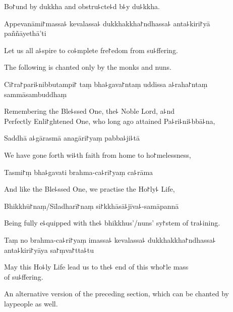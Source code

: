 \begin{english}
  Bo꜓und by dukkha and obstru꜕cte꜕d b꜕y du꜕kkha.
\end{english}

Appevanāmi꜓massa꜕ kevalassa꜕ dukkhakkha꜓ndhassa꜕ anta꜕kiri꜓yā \\paññāyethā'ti

\begin{english}
  Let us all a꜕spire to co꜕mplete fre꜓edom from su꜕ffering.
\end{english}

\begin{instruction}
  The following is chanted only by the monks and nuns.
\end{instruction}

%
Ci꜓ra꜓pari꜕nibbutampi꜓ taṃ bha꜕gava꜓ntaṃ uddissa a꜕raha꜓ntaṃ sammāsambuddhaṃ

\begin{english}
  Remembering the Ble꜕ssed One, the꜕ Noble Lord, a꜕nd \\Perfectly Enli꜓ghtened One, who long ago attained Pa꜕ri꜕ni꜕bbā꜕na,
\end{english}

Saddhā a꜕gārasmā anagāri꜓yaṃ pabba꜕ji꜕tā

\begin{english}
  We have gone forth wi꜕th faith from home to ho꜓melessness,
\end{english}

Tasmi꜓ṃ bha꜕gavati brahma-ca꜕ri꜓yaṃ ca꜕rāma

\begin{english}
  And like the Ble꜕ssed One, we practise the Ho꜓ly꜕ Life,
\end{english}

Bhikkhū꜓naṃ/Sīladharī꜓naṃ si꜓kkhāsā꜕jīva꜕-samāpannā

\begin{english}
  Being fully e꜕quipped with the꜕ bhikkhus'/nuns' sy꜓stem of tra꜕ining.
\end{english}

Taṃ no brahma-ca꜕ri꜓yaṃ imassa꜕ kevalassa꜕ dukkhakkha꜓ndhassa꜕ anta꜕kiri꜓yāya sa꜓ṃva꜓tta꜕tu

\begin{english}
  May this Ho꜕ly Life lead us to the꜕ end of this who꜓le mass \\of su꜕ffering.
\end{english}

\begin{instruction}
  An alternative version of the preceding section, which can be chanted by laypeople as well.
\end{instruction}

